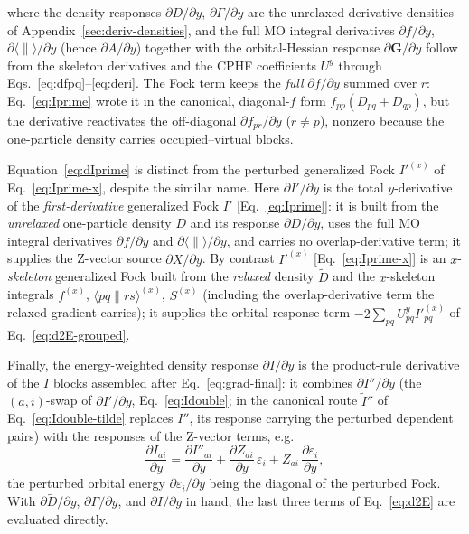 \documentclass[12pt]{article}
\newcommand{\adb}[2]{\langle #1 \| #2 \rangle}
\begin{document}
where the density responses $\partial D/\partial y$, $\partial\Gamma/\partial y$
are the unrelaxed derivative densities of Appendix~\ref{sec:deriv-densities}, and
the full MO integral derivatives $\partial f/\partial y$,
$\partial\adb{}{}/\partial y$ (hence $\partial A/\partial y$) together with the
orbital-Hessian response $\partial\mathbf{G}/\partial y$ follow from the skeleton
derivatives and the CPHF coefficients $U^y$ through
Eqs.~\eqref{eq:dfpq}--\eqref{eq:deri}.  The Fock term keeps the {\em full}
$\partial f/\partial y$ summed over $r$: Eq.~\eqref{eq:Iprime} wrote it in the
canonical, diagonal-$f$ form $f_{pp}(D_{pq}+D_{qp})$, but the derivative
reactivates the off-diagonal $\partial f_{pr}/\partial y$ ($r\neq p$), nonzero
because the one-particle density carries occupied--virtual blocks.

\noindent
Equation~\eqref{eq:dIprime} is distinct from the perturbed generalized Fock
$I'^{(x)}$ of Eq.~\eqref{eq:Iprime-x}, despite the similar name.  Here
$\partial I'/\partial y$ is the total $y$-derivative of the {\em first-derivative}
generalized Fock $I'$ [Eq.~\eqref{eq:Iprime}]: it is built from the {\em unrelaxed}
one-particle density $D$ and its response $\partial D/\partial y$, uses the full MO
integral derivatives $\partial f/\partial y$ and $\partial\adb{}{}/\partial y$, and
carries no overlap-derivative term; it supplies the Z-vector source
$\partial X/\partial y$.  By contrast $I'^{(x)}$ [Eq.~\eqref{eq:Iprime-x}] is an
$x$-{\em skeleton} generalized Fock built from the {\em relaxed} density $\tilde D$
and the $x$-skeleton integrals $f^{(x)}$, $\adb{pq}{rs}^{(x)}$, $S^{(x)}$
(including the overlap-derivative term the relaxed gradient carries); it supplies
the orbital-response term $-2\sum_{pq}U^y_{pq}I'^{(x)}_{pq}$ of
Eq.~\eqref{eq:d2E-grouped}.

Finally, the energy-weighted density response $\partial I/\partial y$ is the
product-rule derivative of the $I$ blocks assembled after
Eq.~\eqref{eq:grad-final}: it combines $\partial I''/\partial y$ (the
$(a,i)$-swap of $\partial I'/\partial y$, Eq.~\eqref{eq:Idouble}; in the canonical
route $\tilde I''$ of Eq.~\eqref{eq:Idouble-tilde} replaces $I''$, its response
carrying the perturbed dependent pairs) with the responses of the Z-vector
terms, e.g.
\begin{equation*}
\frac{\partial I_{ai}}{\partial y} = \frac{\partial I''_{ai}}{\partial y}
+ \frac{\partial Z_{ai}}{\partial y}\,\varepsilon_i
+ Z_{ai}\,\frac{\partial\varepsilon_i}{\partial y},
\end{equation*}
the perturbed orbital energy $\partial\varepsilon_i/\partial y$ being the
diagonal of the perturbed Fock.  With $\partial\tilde D/\partial y$,
$\partial\Gamma/\partial y$, and $\partial I/\partial y$ in hand, the last three
terms of Eq.~\eqref{eq:d2E} are evaluated directly.
\end{document}
